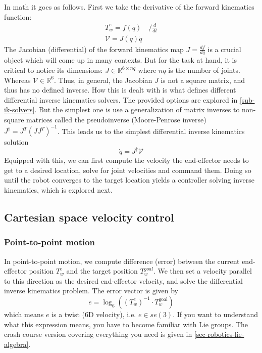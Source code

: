 In math it goes as follows. First we take the derivative
of the forward kinematics function:
\begin{gather}
		T_{ w }^{ e } = f (q) \quad \Big/ \frac{d }{d t} \\
\mathcal{V} = J (q) \dot{q}
\end{gather}
The Jacobian (differential) of the forward kinematics map
$ J = \frac{d f}{dq}   $
is a crucial object which will come up in many contexts.
But for the task at hand, it is critical to notice
its dimensions:
$ J \in \mathbb{R}^{6 \times nq}  $ where $ nq  $ is the number of joints.
Whereas $ \mathcal{V} \in \mathbb{R}^{6}  $.
Thus, in general, the Jacobian $ J  $ is not a square matrix,
and thus has no defined inverse.
How this is dealt with is what defines different
differential inverse kinematics solvers. The provided
options are explored in \ref{sub-ik-solvers}.
But the simplest one is use a generalization of matrix
inverses to non-square matrices called the pseudoinverse (Moore-Penrose
inverse)
$ J^{ \dagger } = J^{ T } (JJ^{ T })^{ -1 }  $.
This leads us to the simplest differential inverse kinematics solution
\begin{equation}
		\dot{q} = J^{ \dagger } \mathcal{V}
\end{equation}
Equipped with this, we can first compute the velocity
the end-effector needs to get to a desired location,
solve for joint velocities and command them.
Doing so until the robot converges to the target location
yields a controller solving inverse kinematics,
which is explored next.

\subsection{Cartesian space velocity control}
\subsubsection{Point-to-point motion}
In point-to-point motion, we compute difference (error) between
the current end-effector position $ T_{ w }^{ e }  $ 
and the target position $ T_{ w }^{ goal }  $. We then set a velocity
parallel to this direction as the desired end-effector velocity,
and solve the differential inverse kinematics problem.
The error vector is given by
\begin{equation}
e = \log_{ 6 } \left( \left(   T_{ w }^{ e }\right)^{ -1 } \cdot T_{ w }^{ \text{goal} }  \right) 
\end{equation}
which means $ e  $ is a twist (6D velocity), i.e. $ e \in se (3)  $.
If you want to understand what this expression means, you have
to become familiar with Lie groups. The crash course version
covering everything you need 
is given in \ref{sec-robotics-lie-algebra}.

